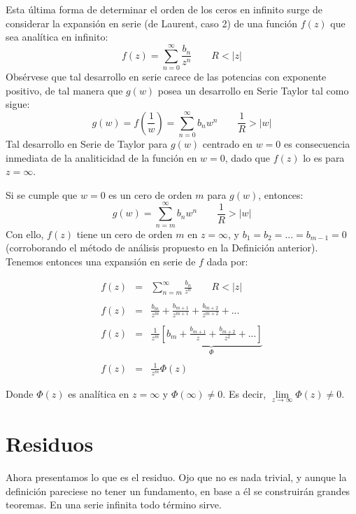 \documentclass[12pt]{article}
\theoremstyle{definition}
\theoremstyle{theorem}
\theoremstyle{corolary}
\theoremstyle{method}
\begin{document}
Esta \'ultima forma de determinar el orden de los ceros en infinito surge de considerar la expansi\'on en serie (de Laurent, caso 2) de una funci\'on $f(z)$ que sea anal\'itica en infinito: $$f(z) = \sum\limits_{n=0}^{\infty}\frac{b_n}{z^n} \qquad R<|z|$$
Obs\'ervese que tal desarrollo en serie carece de las potencias con exponente positivo, de tal manera que $g(w)$ posea un desarrollo en Serie Taylor tal como sigue: $$g(w) = f\left( \frac{1}{w} \right) = \sum\limits_{n=0}^{\infty}b_n w^n \qquad \frac{1}{R}>|w|$$
Tal desarrollo en Serie de Taylor para $g(w)$ centrado en $w=0$ es consecuencia inmediata de la analiticidad de la funci\'on en $w=0$, dado que $f(z)$ lo es para $z=\infty$.

Si se cumple que $w=0$ es un cero de orden $m$ para $g(w)$, entonces: $$g(w) = \sum\limits_{n=m}^{\infty}b_n w^n \qquad \frac{1}{R}>|w|$$ Con ello, $f(z)$ tiene un cero de orden $m$ en $z=\infty$, y $b_1=b_2=...=b_{m-1}=0$ (corroborando el m\'etodo de an\'alisis propuesto en la Definici\'on anterior). Tenemos entonces una expansi\'on en serie de $f$ dada por:

\begin{eqnarray*}
f(z) &=& \sum\limits_{n=m}^{\infty}\frac{b_n}{z^n} \qquad R<|z|\\
\\
f(z) &=& \frac{b_m}{z^m} + \frac{b_{m+1}}{z^{m+1}} + \frac{b_{m+2}}{z^{m+2}} + ...\\
\\
f(z) &=& \frac{1}{z^m} \underbrace{ \left[ b_m + \frac{b_{m+1}}{z} + \frac{b_{m+2}}{z^2} + ... \right] }_{\Phi}\\
\\
f(z) &=& \frac{1}{z^m} \Phi(z)
\end{eqnarray*}

Donde $\Phi(z)$ es anal\'itica en $z=\infty$ y $\Phi(\infty)\neq0$. Es decir, $\lim\limits_{z\to\infty}\Phi(z)\neq 0.$

\section{Residuos}
Ahora presentamos lo que es el residuo. Ojo que no es nada trivial, y aunque la definici\'on pareciese no tener un fundamento, en base a \'el se construir\'an grandes teoremas. En una serie infinita todo t\'ermino sirve.\\
\end{document}
